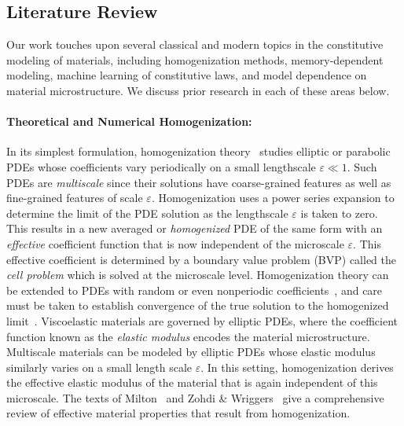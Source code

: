 \documentclass[letterpaper,11pt]{article}
\begin{document}
\subsection{Literature Review}
\label{ssec:LR}
Our work touches upon several classical and modern topics in the constitutive modeling of materials, including homogenization methods, memory-dependent modeling, machine learning of constitutive laws, and model dependence on material microstructure. We discuss prior research in each of these areas below.

\paragraph{Theoretical and Numerical Homogenization:} In its simplest formulation, homogenization theory~\cite{pavliotis2008multiscale} studies elliptic or parabolic PDEs whose coefficients vary periodically on a small lengthscale $\varepsilon \ll 1$. Such PDEs are \textit{multiscale} since their solutions have coarse-grained features as well as fine-grained features of scale $\varepsilon$. Homogenization uses a power series expansion to determine the limit of the PDE solution as the lengthscale $\varepsilon$ is taken to zero. This results in a new averaged or \textit{homogenized} PDE of the same form with an \textit{effective} coefficient function that is now independent of the microscale $\varepsilon$. This effective coefficient is determined by a boundary value problem (BVP) called the \textit{cell problem} which is solved at the microscale level. Homogenization theory can be extended to PDEs with random or even nonperiodic coefficients~\cite{cioranescu1999introduction, kozlov1980averaging}, and care must be taken to establish convergence of the true solution to the homogenized limit~\cite{allaire1992homogenization, cioranescu1999introduction, pavliotis2008multiscale}. Viscoelastic materials are governed by elliptic PDEs, where the coefficient function known as the \textit{elastic modulus} encodes the material microstructure. Multiscale materials can be modeled by elliptic PDEs whose elastic modulus similarly varies on a small length scale $\varepsilon$. In this setting, homogenization derives the effective elastic modulus of the material that is again independent of this microscale. The texts of Milton~\cite{milton_book} and Zohdi \& Wriggers~\cite{zohdi2008introduction} give a comprehensive review of effective material properties that result from homogenization. 
\end{document}
